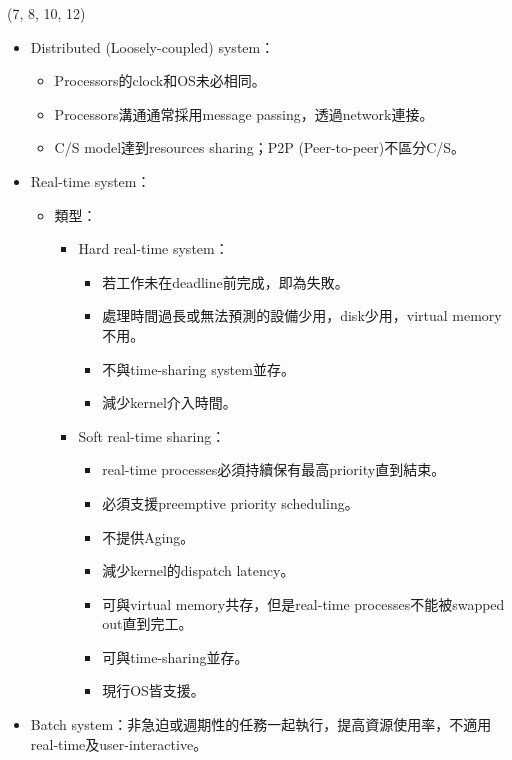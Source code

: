 \begin{theorem}{(7, 8, 10, 12)}
\begin{itemize}
\begin{itemize}
\begin{itemize}
            \end{itemize}
        \end{itemize}
        \item Distributed (Loosely-coupled) system：\begin{itemize}
            \item Processors的clock和OS未必相同。
            \item Processors溝通通常採用message passing，透過network連接。
            \item C/S model達到resources sharing；P2P (Peer-to-peer)不區分C/S。
        \end{itemize}
        \item Real-time system：\begin{itemize}
            \item 類型：\begin{itemize}
                \item Hard real-time system：\begin{itemize}
                    \item 若工作未在deadline前完成，即為失敗。
                    \item 處理時間過長或無法預測的設備少用，disk少用，virtual memory不用。
                    \item 不與time-sharing system並存。
                    \item 減少kernel介入時間。
                \end{itemize}
                \item Soft real-time sharing：\begin{itemize}
                    \item real-time processes必須持續保有最高priority直到結束。
                    \item 必須支援preemptive priority scheduling。
                    \item 不提供Aging。
                    \item 減少kernel的dispatch latency。
                    \item 可與virtual memory共存，但是real-time processes不能被swapped out直到完工。
                    \item 可與time-sharing並存。
                    \item 現行OS皆支援。
                \end{itemize}
            \end{itemize}
        \end{itemize}
        \item Batch system：非急迫或週期性的任務一起執行，提高資源使用率，不適用real-time及user-interactive。
    \end{itemize}
\end{theorem}

